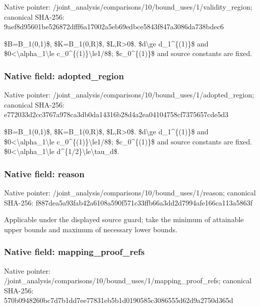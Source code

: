 \documentclass[10pt,a4paper]{article}
\begin{document}
Native pointer: /joint\_analysis/comparis\allowbreak{}ons/10/bound\_uses/1/vali\allowbreak{}dity\_region; canonical SHA-256: 9aef8d95601be526872dfff6\allowbreak{}a17002a5eb69edbce5843f84\allowbreak{}7a3086da738bdec6


\$B=B\_1(0,1)\$, \$K=B\_1(0,R)\$, \$L,R>0\$. \$d\textbackslash{}ge d\_1\textasciicircum{}\{(1)\}\$ and \$0<\textbackslash{}alpha\_1\textbackslash{}le c\_0\textasciicircum{}\{(1)\}\textbackslash{}le1/8\$; \$c\_0\textasciicircum{}\{(1)\}\$ and source constants are fixed.


\subsubsection{Native field: adopted\_region}


Native pointer: /joint\_analysis/comparis\allowbreak{}ons/10/bound\_uses/1/adop\allowbreak{}ted\_region; canonical SHA-256: e772033d2cc3767a978ca3db\allowbreak{}0da14316b28d4a2ea0410475\allowbreak{}8cf7375657cde5d3


\$B=B\_1(0,1)\$, \$K=B\_1(0,R)\$, \$L,R>0\$. \$d\textbackslash{}ge d\_1\textasciicircum{}\{(1)\}\$ and \$0<\textbackslash{}alpha\_1\textbackslash{}le c\_0\textasciicircum{}\{(1)\}\textbackslash{}le1/8\$; \$c\_0\textasciicircum{}\{(1)\}\$ and source constants are fixed. \$0<\textbackslash{}alpha\_1\textbackslash{}le d\textasciicircum{}\{1/2\}\textbackslash{}le\textbackslash{}tau\_d\$.


\subsubsection{Native field: reason}


Native pointer: /joint\_analysis/comparis\allowbreak{}ons/10/bound\_uses/1/reas\allowbreak{}on; canonical SHA-256: f887dea5a93fab42a6108a59\allowbreak{}0f571c33ffb66a3dd2d7994a\allowbreak{}fe166ca113a5863f


Applicable under the displayed source guard; take the minimum of attainable upper bounds and maximum of necessary lower bounds.


\subsubsection{Native field: mapping\_proof\_refs}


Native pointer: /joint\_analysis/comparis\allowbreak{}ons/10/bound\_uses/1/mapp\allowbreak{}ing\_proof\_refs; canonical SHA-256: 570b0948260bc7d7b1dd7ee7\allowbreak{}7831eb5b1d0190585c308655\allowbreak{}5d62d9a2750d365d
\end{document}
